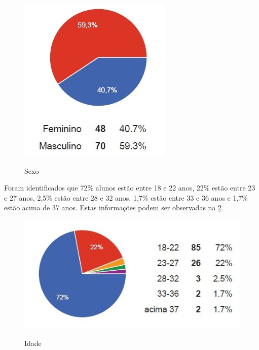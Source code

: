 \documentclass[
	article,			%
	11pt,				%
	oneside,			%
	a4paper,			%
	english,			%
	brazil,				%
	sumario=tradicional
	]{abntex2}
\begin{document}
\begin{figure}[h]  
	\begin{center} 
		\begin{center}
			\changecaptionwidth 
			\captionwidth{13.5cm} %
			\caption{\label{sexo} Sexo}
		 	{\includegraphics[scale=0.8]{imagens/sexo}}
		\end{center}
	\end{center}
\end{figure}
\FloatBarrier


Foram identificados que 72\% alunos estão entre 18 e 22 anos, 22\% estão entre 23 e 27 anos, 2,5\% estão entre 28 e 32 anos, 1,7\% estão entre 33 e 36 anos e 1,7\% estão acima de 37 anos. Estas informações podem ser observadas na \figurename{ \ref{idade}}.

\begin{figure}[h]  
	\begin{center} 
		\begin{center}
			\changecaptionwidth 
			\captionwidth{13.5cm} %
			\caption{\label{idade} Idade}
			{\includegraphics[scale=0.8]{imagens/idade}}
		\end{center}
	\end{center}
\end{figure}
\FloatBarrier
\end{document}
